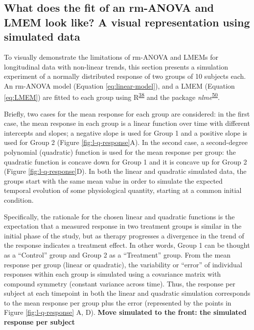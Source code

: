 \documentclass[
]{article}
\begin{document}
\hypertarget{simulation}{%
\subsection{What does the fit of an rm-ANOVA and LMEM look like? A visual representation using simulated data}\label{simulation}}

To visually demonstrate the limitations of rm-ANOVA and LMEMs for longitudinal data with non-linear trends, this section presents a simulation experiment of a normally distributed response of two groups of 10 subjects each. An rm-ANOVA model (Equation \eqref{eq:linear-model}), and a LMEM (Equation \eqref{eq:LMEM}) are fitted to each group using R\textsuperscript{\protect\hyperlink{ref-r}{38}} and the package \emph{nlme}\textsuperscript{\protect\hyperlink{ref-nlme}{50}}.

Briefly, two cases for the mean response for each group are considered: in the first case, the mean response in each group is a linear function over time with different intercepts and slopes; a negative slope is used for Group 1 and a positive slope is used for Group 2 (Figure \ref{fig:l-q-response}A). In the second case, a second-degree polynomial (quadratic) function is used for the mean response per group: the quadratic function is concave down for Group 1 and it is concave up for Group 2 (Figure \ref{fig:l-q-response}D). In both the linear and quadratic simulated data, the groups start with the same mean value in order to simulate the expected temporal evolution of some physiological quantity, starting at a common initial condition.

Specifically, the rationale for the chosen linear and quadratic functions is the expectation that a measured response in two treatment groups is similar in the initial phase of the study, but as therapy progresses a divergence in the trend of the response indicates a treatment effect. In other words, Group 1 can be thought as a ``Control'' group and Group 2 as a ``Treatment'' group. From the mean response per group (linear or quadratic), the variability or ``error'' of individual responses within each group is simulated using a covariance matrix with compound symmetry (constant variance across time). Thus, the response per subject at each timepoint in both the linear and quadratic simulation corresponds to the mean response per group plus the error (represented by the points in Figure \ref{fig:l-q-response} A, D). \textbf{Move simulated to the front: the simulated response per subject}
\end{document}
